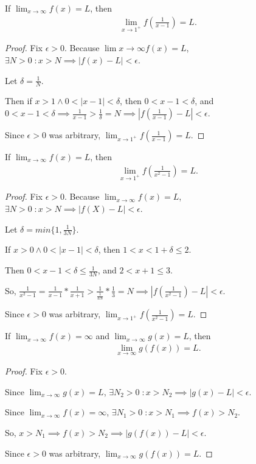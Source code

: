 \documentclass{article} %
\theoremstyle{plain}
\theoremstyle{definition}
\begin{document}
  \noindent{} If $\lim_{x \rightarrow \infty} f(x)=L$,  then 
\begin{align*}
\lim_{x \rightarrow 1^+} f\left(\frac{1}{x-1}\right) = L.
\end{align*}

\begin{proof} Fix $\epsilon > 0$. Because $\lim{x \to \infty} f(x) = L$, $\exists N > 0 \; \colon x > N \implies |f(x) - L| < \epsilon$.

    Let $\delta = \frac{1}{N}$.

    Then if $x > 1 \land 0 < |x-1| < \delta$, then $0 < x-1 < \delta$, and $0 < x-1 < \delta \implies \frac{1}{x-1} > \frac{1}{\delta} = N \implies |f(\frac{1}{x-1}) - L| < \epsilon$.

    Since $\epsilon > 0$ was arbitrary, $\lim_{x \rightarrow 1^+} f\left(\frac{1}{x-1}\right) = L$.
\end{proof}
  
    \noindent{} If $\lim_{x \rightarrow \infty} f(x)=L$,  then 
\begin{align*}
\lim_{x \rightarrow 1^+} f\left(\frac{1}{x^2-1}\right) = L.
\end{align*}

\begin{proof} Fix $\epsilon > 0$. Because $\lim_{x \to \infty} f(x) = L$, $\exists N > 0 \; \colon x > N \implies |f(X) - L| < \epsilon$.

    Let $\delta = min\{1, \frac{1}{3N} \}$.

    If $x>0 \land 0 < |x-1| < \delta$, then $1 < x < 1 + \delta \leq 2$.

    Then $0 < x-1 < \delta \leq \frac{1}{3N}$, and $2 < x+1 \leq 3$.

    So, $\frac{1}{x^2 - 1} = \frac{1}{x-1} * \frac{1}{x+1} > \frac{1}{\frac{1}{3N}} * \frac{1}{3} = N \implies |f(\frac{1}{x^2 - 1}) - L| < \epsilon$.

    Since $\epsilon > 0$ was arbitrary, $\lim_{x \rightarrow 1^+} f\left(\frac{1}{x^2-1}\right) = L$.
\end{proof}


    \noindent{} If $\lim_{x \rightarrow \infty} f(x)=\infty$ and $\lim_{x \rightarrow \infty} g(x) =L$,  then 
\begin{align*}
\lim_{x \rightarrow \infty} g\left(f(x)\right) = L.
\end{align*}

\begin{proof} Fix $\epsilon > 0$.

    Since $\lim_{x \to \infty} g(x) = L$, $\exists N_2 > 0 \; \colon x > N_2 \implies |g(x) - L| < \epsilon$.

    Since $\lim_{x \to \infty} f(x) = \infty$, $\exists N_1 > 0 \; \colon x > N_1 \implies f(x) > N_2$.

    So, $x > N_1 \implies f(x) > N_2 \implies |g(f(x)) - L| < \epsilon$.

    Since $\epsilon > 0$ was arbitrary, $\lim_{x \rightarrow \infty} g\left(f(x)\right) = L$.
\end{proof}
\end{document}
